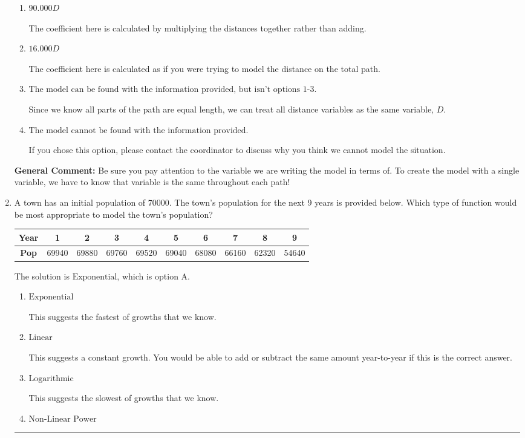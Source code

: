 \documentclass{extbook}[14pt]
\newcommand{\litem}[1]{\item #1

\rule{\textwidth}{0.4pt}}
\begin{document}
\begin{enumerate}
{\begin{enumerate}[label=\Alph*.]
* This is the correct option.
\item \( 90.000 D \)

The coefficient here is calculated by multiplying the distances together rather than adding.
\item \( 16.000 D \)

The coefficient here is calculated as if you were trying to model the distance on the total path.
\item \( \text{The model can be found with the information provided, but isn't options 1-3.} \)

Since we know all parts of the path are equal length, we can treat all distance variables as the same variable, $D$.
\item \( \text{The model cannot be found with the information provided.} \)

If you chose this option, please contact the coordinator to discuss why you think we cannot model the situation.
\end{enumerate}

\textbf{General Comment:} Be sure you pay attention to the variable we are writing the model in terms of. To create the model with a single variable, we have to know that variable is the same throughout each path!
}
\litem{
A town has an initial population of 70000. The town's population for the next 9 years is provided below. Which type of function would be most appropriate to model the town's population?


\begin{tabular}{c|c|c|c|c|c|c|c|c|c}
\textbf{Year} &1 &2 &3 &4 &5 &6 &7 &8 &9\tabularnewline \hline
\textbf{Pop} &69940 &69880 &69760 &69520 &69040 &68080 &66160 &62320 &54640\end{tabular}The solution is \( \text{Exponential} \), which is option A.\begin{enumerate}[label=\Alph*.]
\item \( \text{Exponential} \)

This suggests the fastest of growths that we know.
\item \( \text{Linear} \)

This suggests a constant growth. You would be able to add or subtract the same amount year-to-year if this is the correct answer.
\item \( \text{Logarithmic} \)

This suggests the slowest of growths that we know.
\item \( \text{Non-Linear Power} \)


\end{enumerate}}
\end{enumerate}
\end{document}
